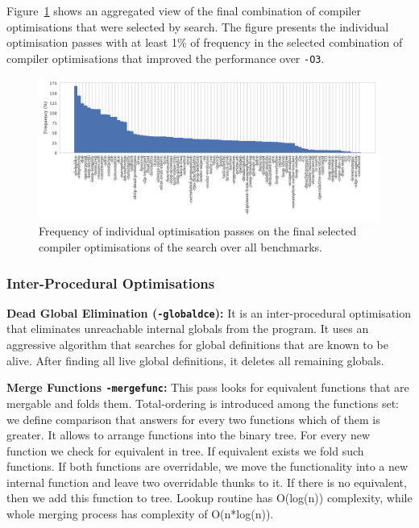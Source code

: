 Figure~\ref{fig:flagsfreq} shows an aggregated view of the final combination of compiler optimisations that were selected by {\itercomp} search.
The figure presents the individual optimisation passes with at least 1\% of frequency in the selected combination of compiler optimisations that improved the performance over {\texttt{-O3}}.

\begin{figure}[htb]
    \centering
    \includegraphics[width=\textwidth]{figs/flagsfreq.pdf}
    \caption{Frequency of individual optimisation passes on the final selected 
             compiler optimisations of the {\itercomp} search over
             all benchmarks.}
    \label{fig:flagsfreq}
\end{figure}

\subsubsection{Inter-Procedural Optimisations}
\noindent\textbf{Dead Global Elimination (\texttt{-globaldce}):}
It is an inter-procedural optimisation that eliminates unreachable internal globals from the program.
It uses an aggressive algorithm that searches for global definitions that are known to be alive.
After finding all live global definitions, it deletes all remaining globals.

\noindent\textbf{Merge Functions \texttt{-mergefunc}:}
This pass looks for equivalent functions that are mergable and folds them.
Total-ordering is introduced among the functions set: we define comparison that answers for every two functions which of them is greater. It allows to arrange functions into the binary tree.
For every new function we check for equivalent in tree.
If equivalent exists we fold such functions. If both functions are overridable, we move the functionality into a new internal function and leave two overridable thunks to it.
If there is no equivalent, then we add this function to tree.
Lookup routine has O(log(n)) complexity, while whole merging process has complexity of O(n*log(n)).

